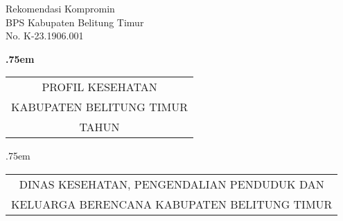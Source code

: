 \begin{titlepage}
    \begin{center}
        {\raggedleft Rekomendasi Kompromin\\BPS Kabupaten Belitung Timur\\No. K-23.1906.001
        
        }
        \vspace*{48ex}
            
        {\LARGE \bfseries
        	\lineskip .75em%
        	\begin{tabular}[t]{c}%
        		PROFIL KESEHATAN\\KABUPATEN BELITUNG TIMUR\\TAHUN \tPnos{}
        	\end{tabular}\par}%
            
            
        \vspace{3ex}
        {\large
        	\lineskip .75em%
        	\begin{tabular}[t]{c}%
        		DINAS KESEHATAN, PENGENDALIAN PENDUDUK DAN\\KELUARGA BERENCANA KABUPATEN BELITUNG TIMUR
        	\end{tabular}\par}%
            
            
        \vspace{1.5ex}
    \end{center}
\end{titlepage}